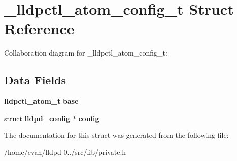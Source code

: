 \section{\-\_\-lldpctl\-\_\-atom\-\_\-config\-\_\-t \-Struct \-Reference}
\label{struct__lldpctl__atom__config__t}


\-Collaboration diagram for \-\_\-lldpctl\-\_\-atom\-\_\-config\-\_\-t\-:
\subsection*{\-Data \-Fields}
\begin{DoxyCompactItemize}
\item 
{\bf lldpctl\-\_\-atom\-\_\-t} {\bfseries base}\label{struct__lldpctl__atom__config__t_add397d02e5d3c1626944dc981febfa0f}

\item 
struct {\bf lldpd\-\_\-config} $\ast$ {\bfseries config}\label{struct__lldpctl__atom__config__t_a6a3986a3261e29573ab6ef4490214dd0}

\end{DoxyCompactItemize}


\-The documentation for this struct was generated from the following file\-:\begin{DoxyCompactItemize}
\item 
/home/evan/lldpd-\/0../src/lib/private.\-h\end{DoxyCompactItemize}
